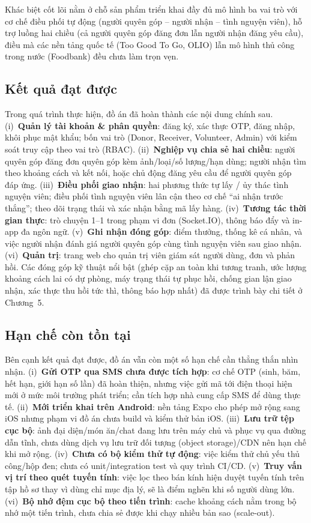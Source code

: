\documentclass[../main.tex]{subfiles}%
\begin{document}
Khác biệt cốt lõi nằm ở chỗ sản phẩm triển khai đầy đủ mô hình ba vai trò với cơ chế điều phối tự động (người quyên góp -- người nhận -- tình nguyện viên), hỗ trợ luồng hai chiều (cả người quyên góp đăng đơn lẫn người nhận đăng yêu cầu), điều mà các nền tảng quốc tế (Too Good To Go, OLIO) lẫn mô hình thủ công trong nước (Foodbank) đều chưa làm trọn vẹn.

\subsection{Kết quả đạt được}
\label{subsection:6.1.2}

Trong quá trình thực hiện, đồ án đã hoàn thành các nội dung chính sau. (i)~\textbf{Quản lý tài khoản \& phân quyền}: đăng ký, xác thực OTP, đăng nhập, khôi phục mật khẩu; bốn vai trò (Donor, Receiver, Volunteer, Admin) với kiểm soát truy cập theo vai trò (RBAC). (ii)~\textbf{Nghiệp vụ chia sẻ hai chiều}: người quyên góp đăng đơn quyên góp kèm ảnh/loại/số lượng/hạn dùng; người nhận tìm theo khoảng cách và kết nối, hoặc chủ động đăng yêu cầu để người quyên góp đáp ứng. (iii)~\textbf{Điều phối giao nhận}: hai phương thức tự lấy / ủy thác tình nguyện viên; điều phối tình nguyện viên lân cận theo cơ chế ``ai nhận trước thắng''; theo dõi trạng thái và xác nhận bằng mã lấy hàng. (iv)~\textbf{Tương tác thời gian thực}: trò chuyện 1--1 trong phạm vi đơn (Socket.IO), thông báo đẩy và in-app đa ngôn ngữ. (v)~\textbf{Ghi nhận đóng góp}: điểm thưởng, thống kê cá nhân, và việc người nhận đánh giá người quyên góp cùng tình nguyện viên sau giao nhận. (vi)~\textbf{Quản trị}: trang web cho quản trị viên giám sát người dùng, đơn và phản hồi.
Các đóng góp kỹ thuật nổi bật (ghép cặp an toàn khi tương tranh, ước lượng khoảng cách lai có dự phòng, máy trạng thái tự phục hồi, chống gian lận giao nhận, xác thực thu hồi tức thì, thông báo hợp nhất) đã được trình bày chi tiết ở Chương~5.

\subsection{Hạn chế còn tồn tại}
\label{subsection:6.1.3}

Bên cạnh kết quả đạt được, đồ án vẫn còn một số hạn chế cần thẳng thắn nhìn nhận. (i)~\textbf{Gửi OTP qua SMS chưa được tích hợp}: cơ chế OTP (sinh, băm, hết hạn, giới hạn số lần) đã hoàn thiện, nhưng việc gửi mã tới điện thoại hiện mới ở mức môi trường phát triển; cần tích hợp nhà cung cấp SMS để dùng thực tế. (ii)~\textbf{Mới triển khai trên Android}: nền tảng Expo cho phép mở rộng sang iOS nhưng phạm vi đồ án chưa build và kiểm thử bản iOS. (iii)~\textbf{Lưu trữ tệp cục bộ}: ảnh đại diện/món ăn/chat đang lưu trên máy chủ và phục vụ qua đường dẫn tĩnh, chưa dùng dịch vụ lưu trữ đối tượng (object storage)/CDN nên hạn chế khi mở rộng. (iv)~\textbf{Chưa có bộ kiểm thử tự động}: việc kiểm thử chủ yếu thủ công/hộp đen; chưa có unit/integration test và quy trình CI/CD. (v)~\textbf{Truy vấn vị trí theo quét tuyến tính}: việc lọc theo bán kính hiện duyệt tuyến tính trên tập hồ sơ thay vì dùng chỉ mục địa lý, sẽ là điểm nghẽn khi số người dùng lớn. (vi)~\textbf{Bộ nhớ đệm cục bộ theo tiến trình}: cache khoảng cách nằm trong bộ nhớ một tiến trình, chưa chia sẻ được khi chạy nhiều bản sao (scale-out).
\end{document}
